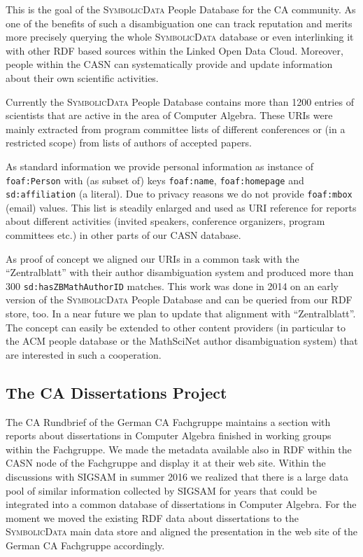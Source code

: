 \documentclass[a4paper,11pt]{article}
\def\SD{\textsc{SymbolicData}}
\begin{document}
This is the goal of the {\SD} People Database for the CA community.  As one of
the benefits of such a disambiguation one can track reputation and merits more
precisely querying the whole {\SD} database or even interlinking it with other
RDF based sources within the Linked Open Data Cloud. Moreover, people within the
CASN can systematically provide and update information about their own
scientific activities.

Currently the {\SD} People Database contains more than 1200 entries of
scientists that are active in the area of Computer Algebra.  These URIs were
mainly extracted from program committee lists of different conferences or (in a
restricted scope) from lists of authors of accepted papers.

As standard information we provide personal information as instance of
\texttt{foaf:Person} with (as subset of) keys \texttt{foaf:name},
\texttt{foaf:homepage} and \texttt{sd:affiliation} (a literal). Due to privacy
reasons we do not provide \texttt{foaf:mbox} (email) values.  This list is
steadily enlarged and used as URI reference for reports about different
activities (invited speakers, conference organizers, program committees etc.)
in other parts of our CASN database.

As proof of concept we aligned our URIs in a common task with the
``Zentralblatt'' with their author disambiguation system and produced more than
300 \texttt{sd:hasZBMathAuthorID} matches. This work was done in 2014 on an
early version of the {\SD} People Database and can be queried from our RDF
store, too.  In a near future we plan to update that alignment with
``Zentralblatt''.  The concept can easily be extended to other content
providers (in particular to the ACM people database or the MathSciNet author
disambiguation system) that are interested in such a cooperation.

\subsection{The CA Dissertations Project}

The CA Rundbrief of the German CA Fachgruppe maintains a section with reports
about dissertations in Computer Algebra finished in working groups within the
Fachgruppe.  We made the metadata available also in RDF within the CASN node of
the Fachgruppe and display it at their web site.  Within the discussions with
SIGSAM in summer 2016 we realized that there is a large data pool of similar
information collected by SIGSAM for years that could be integrated into a
common database of dissertations in Computer Algebra. For the moment we moved
the existing RDF data about dissertations to the {\SD} main data store and
aligned the presentation in the web site of the German CA Fachgruppe
accordingly.
\end{document}
